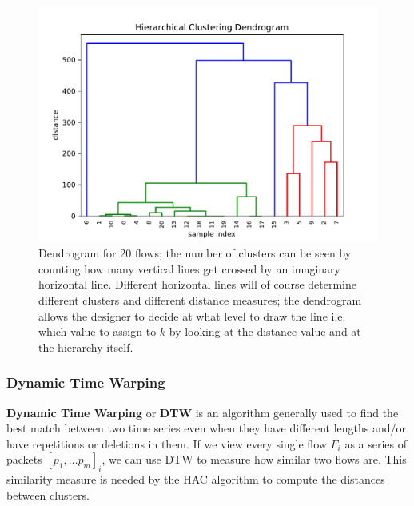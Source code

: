 \begin{figure}[!h]
 \centering
 \includegraphics[scale=0.5]{images/dendrogram}
 \caption{\small{Dendrogram for 20 flows; the number of clusters can be seen by counting how many vertical lines get crossed by an imaginary horizontal line. Different horizontal lines will of course determine different clusters and different distance measures; the dendrogram allows the designer to decide at what level to draw the line i.e. which value to assign to $k$ by looking at the distance value and at the hierarchy itself.}}
 \label{fig:dendro}
\end{figure}

\subsubsection{Dynamic Time Warping}
\label{subsubsec:dtw}
\textbf{Dynamic Time Warping} or \textbf{DTW} is an algorithm generally used to find the best match between two time series even when they have different lengths and/or have repetitions or deletions in them. If we view every single flow $F_i$ as a series of packets $[p_1,\dots p_m]_i$, we can use DTW to measure how similar two flows are. This similarity measure is needed by the HAC algorithm to compute the distances between clusters.

